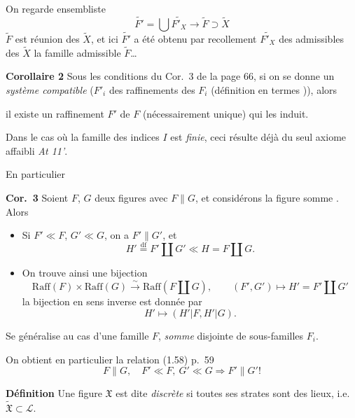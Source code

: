 \documentclass[11pt,a4paper]{article}
\begin{document}
On regarde \ill{} ensembliste
\[
  \widetilde{F'} = \bigcup \widetilde{F'_X} \longrightarrow \widetilde{F} \supset \widetilde{X}
\]
$\widetilde{F}$ est réunion des $\widetilde{X}$, et ici $\widetilde{F'}$ a été obtenu par recollement   $\widetilde{F'_X}$ des \ill{} admissibles des $\widetilde{X}$  la famille admissible $\widetilde{F}$\ldots

\textbf{Corollaire 2} Sous les conditions du Cor.\ 3 de la page 66, si on se donne un \emph{système compatible} ($F'_i$ des raffinements des $F_i$ (définition en termes \ill{})), alors

il existe un raffinement $F'$ de $F$ (nécessairement unique) qui les induit.

Dans le cas où la famille des indices $I$ est \emph{finie}, ceci résulte déjà du seul axiome affaibli \emph{At 11'}.

En particulier

\textbf{Cor.\ 3} Soient $F$, $G$ deux figures avec $F \parallel G$, et considérons la figure  somme . Alors
\begin{itemize}
  \item[(i)] Si $F' \ll F$, $G' \ll G$, on a $F' \parallel G'$, et
  \[
    H' \overset{\mathrm{df}}{=} F' \amalg G' \ll H = F \amalg G .
  \]
  \item[(ii)]  On trouve ainsi une bijection
  \[
    \mathrm{Raff}(F) \times \mathrm{Raff}(G) \xrightarrow{\ \sim\ } \mathrm{Raff}(F \amalg G), \qquad (F', G') \longmapsto H' = F' \amalg G'
  \]
  la bijection en sens inverse est donnée par
  \[
    H' \longmapsto (H'|F, H'|G) .
  \]
\end{itemize}

Se généralise au cas d'une famille $F$, \emph{somme} disjointe de sous-familles $F_i$.

On obtient en particulier la relation (1.58) p.~59
\[
  F \parallel G, \quad F' \ll F,\ G' \ll G \Longrightarrow F' \parallel G' !
\]


\textbf{Définition} Une figure \struck{\ill{}} $\mathfrak{X}$ est dite \emph{discrète} si toutes ses strates sont des lieux, i.e.\ $\widetilde{\mathfrak{X}} \subset \mathcal{L}$.
\end{document}
